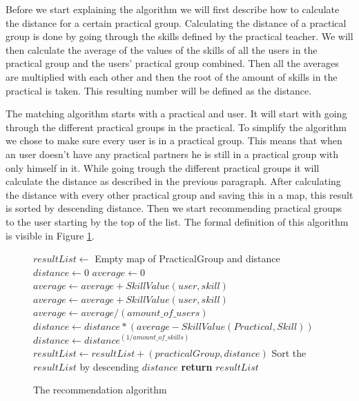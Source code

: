 Before we start explaining the algorithm we will first describe how to calculate the distance for a certain practical group.
Calculating the distance of a practical group is done by going through the skills defined by the practical teacher.
We will then calculate the average of the values of the skills of all the users in the practical group and the users' practical group combined.
Then all the averages are multiplied with each other and then the root of the amount of skills in the practical is taken.
This resulting number will be defined as the distance.

The matching algorithm starts with a practical and user.
It will start with going through the different practical groups in the practical.
To simplify the algorithm we chose to make sure every user is in a practical group.
This means that when an user doesn't have any practical partners he is still in a practical group with only himself in it.
While going trough the different practical groups it will calculate the distance as described in the previous paragraph.
After calculating the distance with every other practical group and saving this in a map, this result is sorted by descending distance.
Then we start recommending practical groups to the user starting by the top of the list.
The formal definition of this algorithm is visible in Figure \ref{recommend}.

\begin{figure}[H]
 \centering
\begin{algorithmic}
	\State $resultList\gets$ Empty map of PracticalGroup and distance
		\State $distance\gets 0$
			\State $average\gets 0$
				\State $average\gets average + SkillValue(user, skill)$
			\EndFor
				\State $average\gets average + SkillValue(user, skill)$
			\EndFor
			\State $average\gets average / (amount\_of\_users)$
			\State $distance\gets distance * (average - SkillValue(Practical, Skill))$
		\EndFor
		\State $distance\gets distance ^ {(1 / amount\_of\_skills)}$
		\State $resultList\gets resultList + (practicalGroup, distance)$
	\EndFor
	\State Sort the $resultList$ by descending $distance$
	\State \textbf{return} $resultList$
\EndFunction
\caption{The recommendation algorithm}\label{recommend}
\end{algorithmic}
\end{figure}

